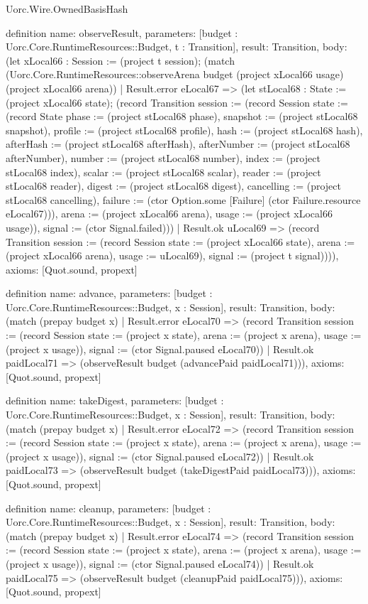 \begin{lexlean}{Uorc.Wire.OwnedBasisHash}
\begin{semanticmodule}
definition{
  name: observeResult,
  parameters: [budget : Uorc.Core.RuntimeResources::Budget, t : Transition],
  result: Transition,
  body: (let xLocal66 : Session := (project t session); (match (Uorc.Core.RuntimeResources::observeArena budget (project xLocal66 usage) (project xLocal66 arena))
    | Result.error eLocal67 => (let stLocal68 : State := (project xLocal66 state); (record Transition {session := (record Session {state := (record State {phase := (project stLocal68 phase), snapshot := (project stLocal68 snapshot), profile := (project stLocal68 profile), hash := (project stLocal68 hash), afterHash := (project stLocal68 afterHash), afterNumber := (project stLocal68 afterNumber), number := (project stLocal68 number), index := (project stLocal68 index), scalar := (project stLocal68 scalar), reader := (project stLocal68 reader), digest := (project stLocal68 digest), cancelling := (project stLocal68 cancelling), failure := (ctor Option.some [Failure] (ctor Failure.resource eLocal67))}), arena := (project xLocal66 arena), usage := (project xLocal66 usage)}), signal := (ctor Signal.failed)}))
    | Result.ok uLocal69 => (record Transition {session := (record Session {state := (project xLocal66 state), arena := (project xLocal66 arena), usage := uLocal69}), signal := (project t signal)}))),
  axioms: [Quot.sound, propext]
}

definition{
  name: advance,
  parameters: [budget : Uorc.Core.RuntimeResources::Budget, x : Session],
  result: Transition,
  body: (match (prepay budget x)
    | Result.error eLocal70 => (record Transition {session := (record Session {state := (project x state), arena := (project x arena), usage := (project x usage)}), signal := (ctor Signal.paused eLocal70)})
    | Result.ok paidLocal71 => (observeResult budget (advancePaid paidLocal71))),
  axioms: [Quot.sound, propext]
}

definition{
  name: takeDigest,
  parameters: [budget : Uorc.Core.RuntimeResources::Budget, x : Session],
  result: Transition,
  body: (match (prepay budget x)
    | Result.error eLocal72 => (record Transition {session := (record Session {state := (project x state), arena := (project x arena), usage := (project x usage)}), signal := (ctor Signal.paused eLocal72)})
    | Result.ok paidLocal73 => (observeResult budget (takeDigestPaid paidLocal73))),
  axioms: [Quot.sound, propext]
}

definition{
  name: cleanup,
  parameters: [budget : Uorc.Core.RuntimeResources::Budget, x : Session],
  result: Transition,
  body: (match (prepay budget x)
    | Result.error eLocal74 => (record Transition {session := (record Session {state := (project x state), arena := (project x arena), usage := (project x usage)}), signal := (ctor Signal.paused eLocal74)})
    | Result.ok paidLocal75 => (observeResult budget (cleanupPaid paidLocal75))),
  axioms: [Quot.sound, propext]
}


\end{semanticmodule}
\end{lexlean}
